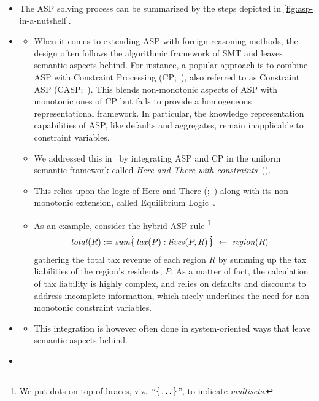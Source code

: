 \begin{itemize}
  \item
  
  The ASP solving process can be summarized by the steps depicted in \cref{fig:asp-in-a-nutshell}.
  \item \cite{cafascwa20a}
  \begin{itemize}
    \item
    When it comes to extending ASP with foreign reasoning methods,
the design often follows the algorithmic framework of SMT and leaves semantic aspects behind.
For instance, a popular approach is to combine ASP with Constraint Processing (CP;~\cite{dechter03a}),
also referred to as Constraint ASP (CASP;~\cite{lierler14a}).
This blends non-monotonic aspects of ASP with monotonic ones of CP but
fails to provide a homogeneous representational framework.
In particular, the knowledge representation capabilities of ASP, like defaults and aggregates, remain inapplicable to constraint variables.
    \item
    We addressed this in~\cite{cakaossc16a} by integrating ASP and CP in the uniform semantic framework called \emph{Here-and-There with constraints}~(\HTC).
    \item
This relies upon the logic of Here-and-There (\HT;~\cite{heyting30a}) along with
its non-monotonic extension, called Equilibrium Logic~\cite{pearce96a}.
    \item
    As an example,
consider the hybrid ASP rule%
\footnote{We put dots on top of braces, viz.~``$\dot{\{} \dotsc \dot{\}}$'', to indicate \emph{multisets}.}
\begin{gather}\label{eq:tax.sum}
  \mathit{total}(R) := \mathit{sum}\dot{\{} \, \mathit{tax}(P) : \mathit{lives}(P,R) \,  \dot{\}} \ \leftarrow \ \mathit{region}(R)
  \quad
\end{gather}
gathering the total tax revenue of each region $R$ by summing up the tax liabilities of the region's residents, $P$.
%
As a matter of fact,
the calculation of tax liability is highly complex, and relies on defaults and discounts to address incomplete information,
which nicely underlines the need for non-monotonic constraint variables.
  \end{itemize}
  \item \cite{cafascwa20b}
    \begin{itemize}
      \item 
      This integration is however often done in system-oriented ways that leave semantic aspects behind.
    \end{itemize}
  \item \cite{cafascwa21a}

\end{itemize}
